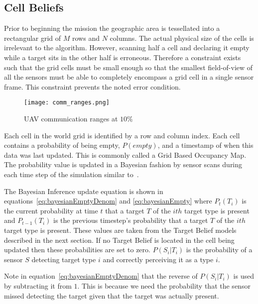 \begin{multicols*}{2}
\subsection{Cell Beliefs}
Prior to beginning the mission the geographic area is tessellated into a rectangular grid of $M$ rows and $N$ columns.  The actual physical size of the cells is irrelevant to the algorithm.  However, scanning half a cell and declaring it empty while a target sits in the other half is erroneous.  Therefore a constraint exists such that the grid cells must be small enough so that the smallest field-of-view of all the sensors must be able to completely encompass a grid cell in a single sensor frame.  This constraint prevents the noted error condition.

\begin{figure}[H]
	\centering
	\texttt{[image: comm\_ranges.png]}
	\caption{UAV communication ranges at $10\%$}
	\label{fig:comm_ranges}
\end{figure}

Each cell in the world grid is identified by a row and column index.  Each cell contains a probability of being empty, $P(empty)$, and a timestamp of when this data was last updated.  This is commonly called a Grid Based Occupancy Map. The probability value is updated in a Bayesian fashion by sensor scans during each time step of the simulation similar to~\cite{waharte}.  

The Bayesian Inference update equation is shown in equations~\ref{eq:bayesianEmptyDenom} and \ref{eq:bayesianEmpty} where $P_{t}(T_{i})$ is the current probability at time $t$ that a target $T$ of the $ith$ target type is present and  $P_{t-1}(T_{i})$ is the previous timestep's probability that a target $T$ of the $ith$ target type is present.  These values are taken from the Target Belief models described in the next section.  If no Target Belief is located in the cell being updated then these probabilities are set to zero.  $P(S_{i}|T_{i})$ is the probability of a sensor $S$ detecting target type $i$ and correctly perceiving it as a type $i$.  

Note in equation~\ref{eq:bayesianEmptyDenom} that the reverse of $P(S_{i}|T_{i})$ is used by subtracting it from $1$.  This is because we need the probability that the sensor missed detecting the target given that the target was actually present.  


\end{multicols*}
